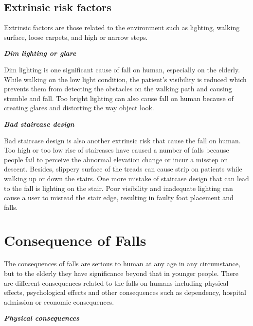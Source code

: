 \documentclass[letterpaper,12pt,titlepage,oneside,final]{book}
\begin{document}
\subsection{Extrinsic risk factors}
Extrinsic factors are those related to the environment such as lighting, walking surface, loose carpets, and high or narrow steps. 

\vspace{0.3cm}
\textbf{\textit{Dim lighting or glare}}\par
Dim lighting is one significant cause of fall on human, especially on the elderly. While walking on the low light condition, the patient's visibility is reduced which prevents them from detecting the obstacles on the walking path and causing stumble and fall. Too bright lighting can also cause fall on human because of creating glares and distorting the way object look. \par
\vspace{0.3cm}
\textbf{\textit{Bad staircase design}}\par

Bad staircase design is also another extrinsic risk that cause the fall on human. Too high or too low rise of staircases have caused a number of falls because people fail to perceive the abnormal elevation change or incur a misstep on descent. Besides, slippery surface of the treads can cause strip on patients while walking up or down the stairs. One more mistake of staircase design that can lead to the fall is lighting on the stair. Poor visibility and inadequate lighting can cause a user to misread the stair edge, resulting in faulty foot placement and falls.
\section{Consequence of Falls}
The consequences of falls are serious to human at any age in any circumstance, but to the elderly they have significance beyond that in younger people. There are different consequences related to the falls on humans including physical effects, psychological effects and other consequences such as dependency, hospital admission or economic consequences. 

\vspace{0.3cm}
\textbf{\textit{Physical consequences}}\par
\end{document}
